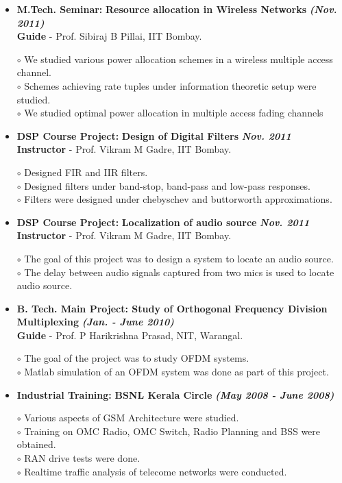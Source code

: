 \documentclass[a4paper,10pt]{article}
\begin{document}
\begin{itemize}
 \item \textbf{M.Tech. Seminar:} \textbf{Resource allocation in Wireless Networks}  \textbf \emph{(Nov. 2011)}\\
        {\textbf{Guide} - Prof. Sibiraj B Pillai, IIT Bombay.   }
        
      $\circ$ We studied various power allocation schemes in a wireless multiple access channel. \\
      $\circ$ Schemes achieving rate tuples under information theoretic setup were studied. \\
      $\circ$ We studied optimal power allocation in multiple access fading channels
       
 \item \textbf{DSP Course Project:} \textbf{Design of Digital Filters} \textbf \emph{Nov. 2011}\\
	{\textbf{Instructor} - Prof. Vikram M Gadre, IIT Bombay. }
	
	$\circ$ Designed FIR and IIR filters. \\
	$\circ$ Designed filters under band-stop, band-pass and low-pass responses. \\
	$\circ$ Filters were designed under chebyschev and buttorworth approximations.
	
 \item \textbf{DSP Course Project:} \textbf{Localization of audio source} \textbf \emph{Nov. 2011}\\
	{\textbf{Instructor} - Prof. Vikram M Gadre, IIT Bombay. }
	
	$\circ$ The goal of this project was to design a system to locate an audio source. \\
	$\circ$ The delay between audio signals captured from two mics is used to locate audio source.

  \item \textbf{{B. Tech. Main Project}: Study of Orthogonal Frequency Division Multiplexing}  \textbf \emph{(Jan. - June 2010)}\\
        {\textbf{Guide} - Prof. P Harikrishna Prasad, NIT, Warangal. }
        
$\circ$ The goal of the project was to study OFDM systems. \\
$\circ$ Matlab simulation of an OFDM system was done as part of this project.

  \item \textbf{Industrial Training:} \textbf{BSNL Kerala Circle}  \textbf \emph{(May 2008 - June 2008)}        

  $\circ$ Various aspects of GSM Architecture were studied. \\
  $\circ$ Training on OMC Radio, OMC Switch, Radio Planning and BSS were obtained. \\
  $\circ$ RAN drive tests were done. \\
  $\circ$ Realtime traffic analysis of telecome networks were conducted.

 \end{itemize}
 
\end{document}
